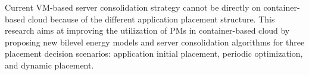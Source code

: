 Current VM-based server consolidation strategy cannot be directly on container-based cloud because of the different application placement structure. This research aims at improving the utilization of PMs in container-based cloud by proposing new bilevel energy models and server consolidation algorithms for three placement decision scenarios: application initial placement, periodic optimization, and dynamic placement.





\vspace{5mm}
